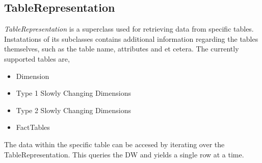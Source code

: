 \subsection{TableRepresentation}
\textit{TableRepresentation} is a superclass used for retrieving data from specific tables. Instatations of its subclasses contains additional information regarding the tables themselves, such as the table name, attributes and et cetera. The currently supported tables are,
\begin{itemize}
\item Dimension
\item Type 1 Slowly Changing Dimensions
\item Type 2 Slowly Changing Dimensions
\item FactTables
\end{itemize}

The data within the specific table can be accesed by iterating over the TableRepresentation. This queries the DW and yields a single row at a time.
